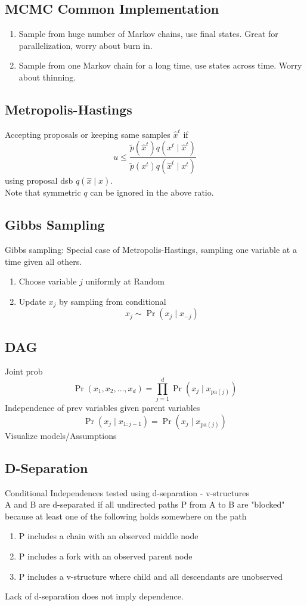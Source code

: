 \subsection*{MCMC Common Implementation}
\begin{enumerate}
    \item Sample from huge number of Markov chains, use final states. 
    Great for parallelization, worry about burn in.
    \item Sample from one Markov chain for a long time, use states across time.
    Worry about thinning.
\end{enumerate}
\subsection*{Metropolis-Hastings}
Accepting proposals or keeping same samples $\hat{x}^t$ if
\[u\leq \frac{\tilde{p}(\hat{x}^t)q(x^t\mid \hat{x}^t)}
{\tilde{p}(x^t)q(\hat{x}^t\mid x^t)}\]
using proposal dsb $q(\hat{x}\mid x)$.\\
Note that symmetric $q$ can be ignored in the above ratio.
\subsection*{Gibbs Sampling}
Gibbs sampling: Special case of Metropolis-Hastings, 
sampling one variable at a time given all others.
\begin{enumerate}
    \item Choose variable $j$ uniformly at Random
    \item Update $x_j$ by sampling from conditional
    \[x_j\sim\Pr(x_j\mid x_{-j})\]
\end{enumerate}
\subsection*{DAG}
Joint prob
\[\Pr(x_1,x_2,\dots,x_d)=\prod_{j=1}^d\Pr(x_j\mid x_{\text{pa}(j)})\]
Independence of prev variables given parent variables\\
\[\Pr(x_j\mid x_{1:j-1})=\Pr(x_j\mid x_{\text{pa}(j)})\]
Visualize models/Assumptions\\
\subsection*{D-Separation}
Conditional Independences tested using d-separation - v-structures\\
A and B are d-separated if all undirected paths P from A to B are "blocked"
because at least one of the following holds somewhere on the path
\begin{enumerate}
    \item P includes a chain with an observed middle node
    \item P includes a fork with an observed parent node
    \item P includes a v-structure where child and all descendants are unobserved
\end{enumerate}
Lack of d-separation does not imply dependence.

